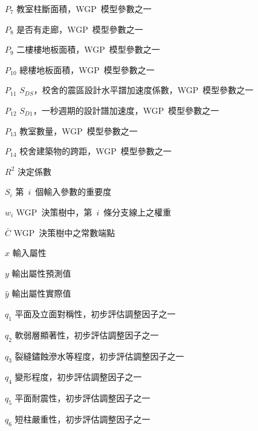 \begin{SymEntry}
\item[$P_7$]
教室柱斷面積，WGP~模型參數之一

\item[$P_8$]
是否有走廊，WGP~模型參數之一

\item[$P_9$]
二樓樓地板面積，WGP~模型參數之一

\item[$P_{10}$]
總樓地板面積，WGP~模型參數之一

\item[$P_{11}$]
$S_{DS}$，校舍的震區設計水平譜加速度係數，WGP~模型參數之一

\item[$P_{12}$]
$S_{D1}$，一秒週期的設計譜加速度，WGP~模型參數之一

\item[$P_{13}$]
教室數量，WGP~模型參數之一

\item[$P_{14}$]
校舍建築物的跨距，WGP~模型參數之一

\item[$R^2$]
決定係數

\item[$S_i$]
第~$i$~個輸入參數的重要度

\item[$w_i$]
WGP~決策樹中，第~$i$~條分支線上之權重

\item[$\bar{C}$]
WGP~決策樹中之常數端點

\item[$x$]
輸入屬性

\item[$y$]
輸出屬性預測值

\item[$\hat{y}$]
輸出屬性實際值

\item[$q_1$]
平面及立面對稱性，初步評估調整因子之一

\item[$q_2$]
軟弱層顯著性，初步評估調整因子之一

\item[$q_3$]
裂縫鏽蝕滲水等程度，初步評估調整因子之一

\item[$q_4$]
變形程度，初步評估調整因子之一

\item[$q_5$]
平面耐震性，初步評估調整因子之一

\item[$q_6$]
短柱嚴重性，初步評估調整因子之一

\end{SymEntry}